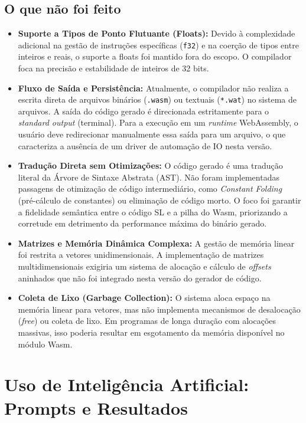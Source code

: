 \documentclass[12pt,a4paper]{article}
\begin{document}
\subsection{O que não foi feito}
\begin{itemize}
    \item \textbf{Suporte a Tipos de Ponto Flutuante (Floats):} Devido à complexidade adicional na gestão de instruções específicas (\texttt{f32}) e na coerção de tipos entre inteiros e reais, o suporte a floats foi mantido fora do escopo. O compilador foca na precisão e estabilidade de inteiros de 32 bits.
    
    \item \textbf{Fluxo de Saída e Persistência:} Atualmente, o compilador não realiza a escrita direta de arquivos binários (\texttt{.wasm}) ou textuais (\texttt{*.wat}) no sistema de arquivos. A saída do código gerado é direcionada estritamente para o \textit{standard output} (terminal). Para a execução em um \textit{runtime} WebAssembly, o usuário deve redirecionar manualmente essa saída para um arquivo, o que caracteriza a ausência de um driver de automação de IO nesta versão.

    \item \textbf{Tradução Direta sem Otimizações:} O código gerado é uma tradução literal da Árvore de Sintaxe Abstrata (AST). Não foram implementadas passagens de otimização de código intermediário, como \textit{Constant Folding} (pré-cálculo de constantes) ou eliminação de código morto. O foco foi garantir a fidelidade semântica entre o código SL e a pilha do Wasm, priorizando a corretude em detrimento da performance máxima do binário gerado.
    
    
    \item \textbf{Matrizes e Memória Dinâmica Complexa:} A gestão de memória linear foi restrita a vetores unidimensionais. A implementação de matrizes multidimensionais exigiria um sistema de alocação e cálculo de \textit{offsets} aninhados que não foi integrado nesta versão do gerador de código.
    
    \item \textbf{Coleta de Lixo (Garbage Collection):} O sistema aloca espaço na memória linear para vetores, mas não implementa mecanismos de desalocação (\textit{free}) ou coleta de lixo. Em programas de longa duração com alocações massivas, isso poderia resultar em esgotamento da memória disponível no módulo Wasm.
\end{itemize}

\section{Uso de Inteligência Artificial: Prompts e Resultados}
\end{document}
